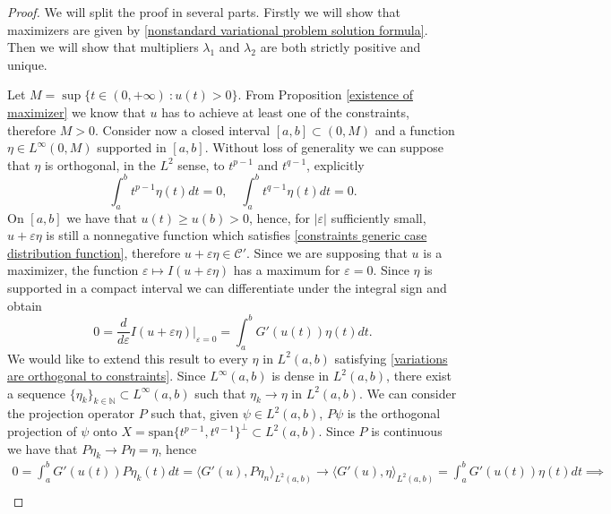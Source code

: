 \documentclass[corpo=11pt, stile=classica, tipotesi=custom,
greek, evenboxes, english]{toptesi}
\numberwithin{equation}{chapter}
\theoremstyle{remark}
\newcommand{\N}{\mathbb{N}} %
\begin{document}
\begin{proof}
{\color{blue} We will split the proof in several parts. Firstly we will show that maximizers are given by \eqref{nonstandard variational problem solution formula}. Then we will show that multipliers $\lambda_1$ and $\lambda_2$ are both strictly positive and unique.}

Let $M = \sup\{t \in (0,+\infty)\ : u(t) > 0\}$. From Proposition \ref{existence of maximizer} we know that $u$ has to achieve at least one of the constraints, therefore $M>0$. Consider now a closed interval $[a,b] \subset (0,M)$ and a function $\eta \in L^{\infty}(0,M)$ supported in $[a,b]$. Without loss of generality we can suppose that $\eta$ is orthogonal, in the $L^2$ sense, to $t^{p-1}$ and $t^{q-1}$, explicitly
\begin{equation}\label{variations are orthogonal to constraints}
	\int_a^b t^{p-1} \eta(t) dt=0, \quad \int_a^b t^{q-1} \eta(t) dt=0.
\end{equation}
On $[a,b]$ we have that $u(t) \geq u(b) > 0$, hence, for $|\varepsilon|$ sufficiently small, $u+\varepsilon\eta$ is still a nonnegative function which satisfies \eqref{constraints generic case distribution function}, therefore $u+\varepsilon\eta \in \mathcal{C}'$. Since we are supposing that $u$ is a maximizer, the function $\varepsilon \mapsto I(u+\varepsilon\eta)$ has a maximum for $\varepsilon = 0$. Since $\eta$ is supported in a compact interval we can differentiate under the integral sign and obtain
\begin{equation*}
	0 = \dfrac{d}{d\varepsilon}I(u+\varepsilon\eta) \lvert_{\varepsilon=0} = \int_a^b G'(u(t))\eta(t)dt.
\end{equation*}
We would like to extend this result to every $\eta$ in $L^2(a,b)$ satisfying \eqref{variations are orthogonal to constraints}. {\color{blue}Since $L^{\infty}(a,b)$ is dense in $L^2(a,b)$, there exist a sequence $\{\eta_k\}_{k \in \N} \subset L^{\infty}(a,b)$ such that $\eta_k \rightarrow \eta$ in $L^2(a,b)$. We can consider the projection operator $P$ such that, given $\psi \in L^2(a,b)$, $P\psi$ is the orthogonal projection of $\psi$ onto $ X = \mathrm{span}\{t^{p-1},t^{q-1}\}^{\perp} \subset L^2(a,b)$. Since $P$ is continuous we have that $P\eta_k \rightarrow P\eta = \eta$, hence
\begin{gather}
	0 = \int_a^b G'(u(t)) P\eta_k(t) dt = \langle G'(u), P\eta_n \rangle_{L^2(a,b)} \rightarrow \langle G'(u), \eta \rangle_{L^2(a,b)} = \int_a^b G'(u(t)) \eta(t) dt \implies \nonumber\\

\end{gather}}
\end{proof}
\end{document}
